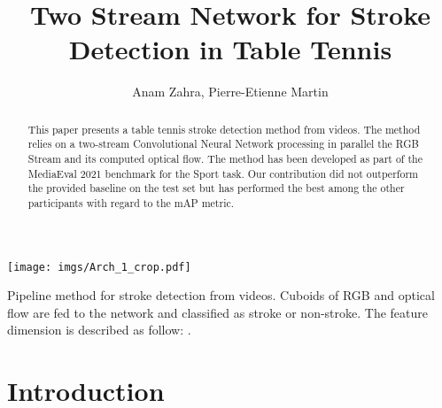 \documentclass[sigconf]{acmart-me}
\begin{document}
\title{Two Stream Network for Stroke Detection in Table Tennis}



\author{Anam Zahra, Pierre-Etienne Martin}




\renewcommand{\shorttitle}{Sports Video Task}


\begin{abstract}
This paper presents a table tennis stroke detection method from videos. The method relies on a two-stream Convolutional Neural Network processing in parallel the RGB Stream and its computed optical flow. The method has been developed as part of the MediaEval 2021 benchmark for the Sport task. Our contribution did not outperform the provided baseline on the test set but has performed the best among the other participants with regard to the mAP metric.
\end{abstract}

\begin{teaserfigure}
    \texttt{[image: imgs/Arch\_1\_crop.pdf]}
    \caption{Pipeline method for stroke detection from videos. Cuboids of RGB and optical flow are fed to the network and classified as stroke or non-stroke. The feature dimension is described as follow: .
    }
    \label{fig:model_fig}
\end{teaserfigure}




\maketitle

\section{Introduction}
\label{sec:intro}
\end{document}
